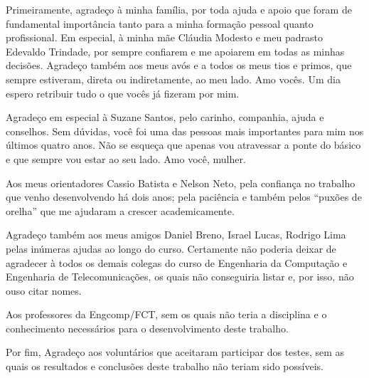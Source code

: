 Primeiramente, agradeço à minha família, por toda ajuda e apoio que foram de
fundamental importância tanto para a minha formação pessoal quanto profissional.
Em especial, à minha mãe Cláudia Modesto e meu padrasto Edevaldo Trindade, por
sempre confiarem e me apoiarem em todas as minhas decisões. Agradeço também aos
meus avós e a todos os meus tios e primos, que sempre estiveram, direta ou
indiretamente, ao meu lado. Amo vocês. Um dia espero retribuir tudo o que vocês
já fizeram por mim.

Agradeço em especial à Suzane Santos, pelo carinho, companhia, ajuda e
conselhos. Sem dúvidas, você foi uma das pessoas mais importantes para mim nos
últimos quatro anos. Não se esqueça que apenas vou atravessar a ponte do básico 
e que sempre vou estar ao seu lado. Amo você, mulher.  

Aos meus orientadores Cassio Batista e Nelson Neto, pela confiança no trabalho
que venho desenvolvendo há dois anos; pela paciência e também pelos ``puxões de
orelha'' que me ajudaram a crescer academicamente. 

Agradeço também aos meus amigos Daniel Breno, Israel Lucas, Rodrigo Lima pelas
inúmeras ajudas ao longo do curso. Certamente não poderia deixar de agradecer à
todos os demais colegas do curso de Engenharia da Computação e Engenharia de
Telecomunicações, os quais não conseguiria listar e, por isso, não ouso citar
nomes.

Aos professores da Engcomp/FCT, sem os quais não teria a disciplina e o
conhecimento necessários para o desenvolvimento deste trabalho.

Por fim, Agradeço aos voluntários que aceitaram participar dos testes, sem as quais
os resultados e conclusões deste trabalho não teriam sido possíveis.
